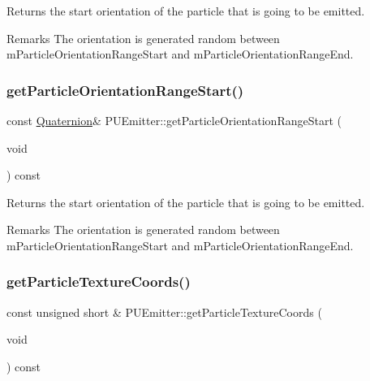 Returns the start orientation of the particle that is going to be emitted. \begin{DoxyRemark}{Remarks}
The orientation is generated random between m\+Particle\+Orientation\+Range\+Start and m\+Particle\+Orientation\+Range\+End. 
\end{DoxyRemark}
\mbox{\label{classPUEmitter_a33f20cb802c479d1816f6ffc561c65fe}} 
\subsubsection{\texorpdfstring{get\+Particle\+Orientation\+Range\+Start()}{getParticleOrientationRangeStart()}\hspace{0.1cm}{\footnotesize\ttfamily [2/2]}}
{\footnotesize\ttfamily const \hyperlink{classQuaternion}{Quaternion}\& P\+U\+Emitter\+::get\+Particle\+Orientation\+Range\+Start (\begin{DoxyParamCaption}\item[{void}]{ }\end{DoxyParamCaption}) const}

Returns the start orientation of the particle that is going to be emitted. \begin{DoxyRemark}{Remarks}
The orientation is generated random between m\+Particle\+Orientation\+Range\+Start and m\+Particle\+Orientation\+Range\+End. 
\end{DoxyRemark}
\mbox{\label{classPUEmitter_a6b402a0fcb4600bb53b77b67dd9c4bd8}} 
\subsubsection{\texorpdfstring{get\+Particle\+Texture\+Coords()}{getParticleTextureCoords()}\hspace{0.1cm}{\footnotesize\ttfamily [1/2]}}
{\footnotesize\ttfamily const unsigned short \& P\+U\+Emitter\+::get\+Particle\+Texture\+Coords (\begin{DoxyParamCaption}\item[{void}]{ }\end{DoxyParamCaption}) const}

